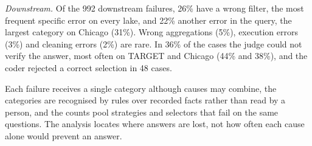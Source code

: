 \emph{Downstream.} Of the 992 downstream failures, 26\% have a wrong filter,
the most frequent specific error on every lake, and 22\% another error in the
query, the largest category on Chicago (31\%). Wrong aggregations (5\%),
execution errors (3\%) and cleaning errors (2\%) are rare. In 36\% of the
cases the judge could not verify the answer, most often on TARGET and Chicago
(44\% and 38\%), and the coder rejected a correct selection in 48 cases.

Each failure receives a single category although causes may combine, the
categories are recognised by rules over recorded facts rather than read by a
person, and the counts pool strategies and selectors that fail on the same
questions. The analysis locates where answers are lost, not how often each
cause alone would prevent an answer.

